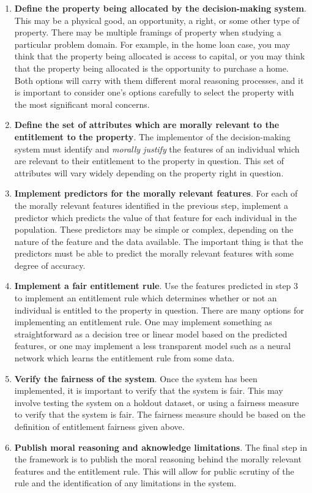 \begin{enumerate}
    \item \textbf{Define the property being allocated by the decision-making
    system}. This may be a physical good, an opportunity, a right, or some other
    type of property. There may be multiple framings of property when studying a
    particular problem domain. For example, in the home loan case, you may think
    that the property being allocated is access to capital, or you may think
    that the property being allocated is the opportunity to purchase a home.
    Both options will carry with them different moral reasoning processes, and
    it is important to consider one's options carefully to select the property
    with the most significant moral concerns.
    \item \textbf{Define the set of attributes which are morally relevant to the
    entitlement to the property}. The implementor of the decision-making system
    must identify and \emph{morally justify} the features of an individual which
    are relevant to their entitlement to the property in question. This set of
    attributes will vary widely depending on the property right in question.
    \item \textbf{Implement predictors for the morally relevant features}.
    For each of the morally relevant features identified in the previous step,
    implement a predictor which predicts the value of that feature for each
    individual in the population. These predictors may be simple or complex,
    depending on the nature of the feature and the data available. The important
    thing is that the predictors must be able to predict the morally relevant
    features with some degree of accuracy.
    \item \textbf{Implement a fair entitlement rule}. Use the features predicted
    in step 3 to implement an entitlement rule which determines whether or not
    an individual is entitled to the property in question. There are many
    options for implementing an entitlement rule. One may implement something as
    straightforward as a decision tree or linear model based on the predicted
    features, or one may implement a less transparent model such as a neural
    network which learns the entitlement rule from some data.
    \item \textbf{Verify the fairness of the system}. Once the system has been
    implemented, it is important to verify that the system is fair. This may
    involve testing the system on a holdout dataset, or using a fairness measure
    to verify that the system is fair. The fairness measure should be based on
    the definition of entitlement fairness given above.
    \item \textbf{Publish moral reasoning and aknowledge limitations}. The
    final step in the framework is to publish the moral reasoning behind the
    morally relevant features and the entitlement rule. This will allow for
    public scrutiny of the rule and the identification of any limitations in the
    system.
\end{enumerate}

